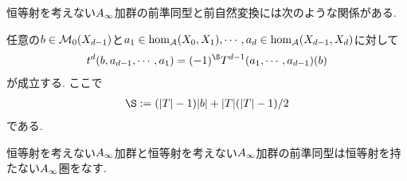 \documentclass[uplatex, a4paper, 14Q, dvipdfmx]{jsarticle}
\begin{document}
恒等射を考えない$A_{\infty}$加群の前準同型と前自然変換には次のような関係がある. 

\begin{lemma}
  任意の$b \in \mathcal{M}_0(X_{d-1})$と$a_1 \in \hom_{\mathcal{A}}(X_0,X_1), \cdots, a_d \in \hom_{\mathcal{A}}(X_{d-1},X_d)$に対して
  \begin{align*}
    t^d(b,a_{d-1},\cdots,a_1) 
    = (-1)^\S T^{d-1}(a_1,\cdots,a_{d-1})(b)
  \end{align*}
  が成立する. 
  ここで
  \begin{align*}
    \S 
    := (|T|-1)|b| + |T|(|T|-1) / 2
  \end{align*}
  である. 
\end{lemma}

恒等射を考えない$A_{\infty}$加群と恒等射を考えない$A_{\infty}$加群の前準同型は恒等射を持たない$A_{\infty}$圏をなす. 
\end{document}
